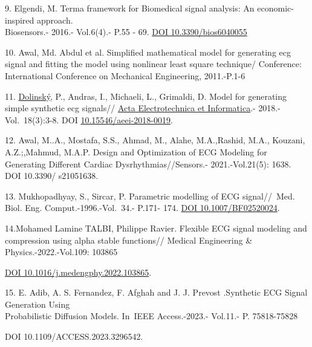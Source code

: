 \begin{references}
9. Elgendi, M. Terma framework for Biomedical signal analysis: An
economic-inspired approach. \\Biosensors.- 2016.- Vol.6(4).- P.55 - 69.
\href{https://doi.org/10.3390/bios6040055}{DOI 10.3390/bios6040055}

10. Awal, Md. Abdul et al. Simplified mathematical model for generating
ecg signal and fitting the model using nonlinear least square technique/
Conference: International Conference on Mechanical Engineering,
2011.-P.1-6

11.
\href{https://www.researchgate.net/scientific-contributions/Pavol-Dolinsky-2111486589?_sg\%5B0\%5D=OpDWPWB7F-xsKNW7QhdA72wrK8fp7beQ04-y1V0k2OSl-vY7yVCBibx1np_IexfBvwzs1tc.3cwJN3iOVCnhElwMBHi_44SzEhdGHYZWVIVDkbQ1O1b7A14CJ6y-CqFfnB303LWj8pCAkU8V0IFoKmFKiUohPw&_sg\%5B1\%5D=AVFGn2hkG-rhmm2v1aXJV9E-zSTVwesxqk3bJDU_jEY7VSRsfP3brCGDMfFzLd-5yvpDVx0.qPkk_lpV-CUBkVH8P4FChkQpEOFV8sRGeKQiTftWsOp6D_liXpE1YL21VpUyx-lJcgXk9ynFK7DYQ-rBYDhYVA}{Dolinský},
P., Andras, I., Michaeli, L., Grimaldi, D. Model for generating simple
synthetic ecg signals//
\href{https://www.researchgate.net/journal/Acta-Electrotechnica-et-Informatica-1338-3957?_tp=eyJjb250ZXh0Ijp7ImZpcnN0UGFnZSI6InB1YmxpY2F0aW9uIiwicGFnZSI6InB1YmxpY2F0aW9uIiwicG9zaXRpb24iOiJwYWdlSGVhZGVyIn19}{Acta
Electrotechnica et Informatica}.- 2018.-Vol.~18(3):3-8. DOI
\href{http://dx.doi.org/10.15546/aeei-2018-0019}{10.15546/aeei-2018-0019}.

12. Awal, M..A., Mostafa, S.S., Ahmad, M., Alahe, M.A.,Rashid, M.A.,
Kouzani, A.Z.;,Mahmud, M.A.P. Design and Optimization of ECG Modeling
for Generating Different Cardiac Dysrhythmias//Sensors.-
2021.-Vol.21(5): 1638. DOI 10.3390/ s21051638.

13. Mukhopadhyay, S., Sircar, P. Parametric modelling of ECG
signal//~Med. Biol. Eng. Comput.-1996.-Vol.~34.- P.171- 174.
\href{https://doi.org/10.1007/BF02520024}{DOI 10.1007/BF02520024}.

14.Mohamed Lamine TALBI, Philippe Ravier. Flexible ECG signal modeling
and compression using alpha stable functions// Medical Engineering \&
Physics.-2022.-Vol.109: 103865

\href{https://doi.org/10.1016/j.medengphy.2022.103865}{DOI
10.1016/j.medengphy.2022.103865}.

15. E. Adib, A. S. Fernandez, F. Afghah and J. J. Prevost .Synthetic ECG
Signal Generation Using \\Probabilistic Diffusion Models. In~IEEE
Access.-2023.- Vol.11.- P. 75818-75828

DOI 10.1109/ACCESS.2023.3296542.


\end{references}
